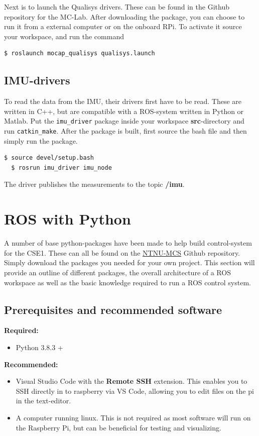 Next is to launch the Qualisys drivers. These can be found in the Github repository for the MC-Lab. After downloading the package, you can choose to run it from a external computer or on the onboard RPi. To activate it source your workspace, and run the command


\begin{lstlisting}[language=bash,basicstyle=\mlttfamily, breaklines=true]
  $ roslaunch mocap_qualisys qualisys.launch
\end{lstlisting}

\subsection{IMU-drivers}

To read the data from the IMU, their drivers first have to be read. These are written in C++, but are compatible with a ROS-system written in Python or Matlab. Put the \lstinline{imu_driver} package inside your workspace \textbf{src}-directory and run \lstinline{catkin_make}. After the package is built, first source the bash file and then simply run the package.

\begin{lstlisting}[language=bash,basicstyle=\mlttfamily, breaklines=true]
  $ source devel/setup.bash
  $ rosrun imu_driver imu_node
\end{lstlisting}

The driver publishes the measurements to the topic \textbf{/imu}. 


\section{ROS with Python}

A number of base python-packages have been made to help build control-system for the CSE1. These can all be found on the \href{https://github.com/NTNU-MCS}{NTNU-MCS} Github repository. Simply download the packages you needed for your own project. This section will provide an outline of different packages, the overall architecture of a ROS workspace as well as the basic knowledge required to run a ROS control system. 

\subsection{Prerequisites and recommended software}

\textbf{Required:}
\begin{itemize}
    \item Python 3.8.3 +
\end{itemize}
\textbf{Recommended:}
\begin{itemize}
    \item Visual Studio Code with the \textbf{Remote SSH} extension. This enables you to SSH directly in to raspberry via VS Code, allowing you to edit files on the pi in the text-editor.
    \item A computer running linux. This is not required as most software will run on the Raspberry Pi, but can be beneficial for testing and visualizing.
\end{itemize}

